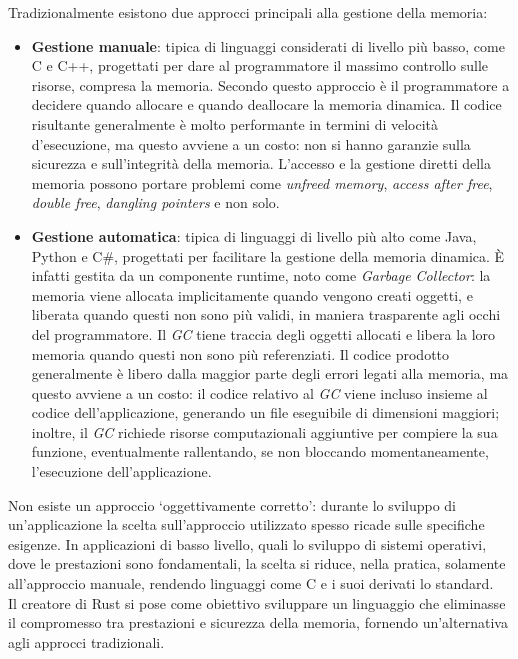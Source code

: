 Tradizionalmente esistono due approcci principali alla gestione della memoria:
\begin{itemize}
    \item \textbf{Gestione manuale}: tipica di linguaggi considerati di livello più basso, come C e C++, progettati per dare al programmatore il massimo controllo sulle risorse, compresa la memoria. Secondo questo approccio è il programmatore a decidere quando allocare e quando deallocare la memoria dinamica. Il codice risultante generalmente è molto performante in termini di velocità d'esecuzione, ma questo avviene a un costo: non si hanno garanzie sulla sicurezza e sull'integrità della memoria. L'accesso e la gestione diretti della memoria possono portare problemi come \textit{unfreed memory}, \textit{access after free}, \textit{double free}, \textit{dangling pointers} e non solo.
    \item \textbf{Gestione automatica}: tipica di linguaggi di livello più alto come Java, Python e C\#, progettati per facilitare la gestione della memoria dinamica. È infatti gestita da un componente runtime, noto come \textit{Garbage Collector}: la memoria viene allocata implicitamente quando vengono creati oggetti, e liberata quando questi non sono più validi, in maniera trasparente agli occhi del programmatore. Il \textit{GC} tiene traccia degli oggetti allocati e libera la loro memoria quando questi non sono più referenziati. Il codice prodotto generalmente è libero dalla maggior parte degli errori legati alla memoria, ma questo avviene a un costo: il codice relativo al \textit{GC} viene incluso insieme al codice dell'applicazione, generando un file eseguibile di dimensioni maggiori; inoltre, il \textit{GC} richiede risorse computazionali aggiuntive per compiere la sua funzione, eventualmente rallentando, se non bloccando momentaneamente, l'esecuzione dell'applicazione.
\end{itemize}
Non esiste un approccio `oggettivamente corretto': durante lo sviluppo di un'applicazione 
la scelta sull'approccio utilizzato spesso ricade sulle specifiche esigenze.
In applicazioni di basso livello, quali lo sviluppo di sistemi operativi, dove le prestazioni sono fondamentali, la scelta si riduce, 
nella pratica, solamente all'approccio manuale, rendendo linguaggi come C e i suoi derivati lo standard.\hfill
\vspace{15pt}\\
Il creatore di Rust si pose come obiettivo sviluppare un linguaggio che eliminasse il compromesso tra prestazioni e sicurezza della memoria, fornendo un'alternativa agli approcci tradizionali.

